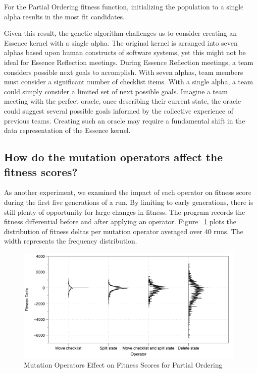 \documentclass[3p,times,procedia]{elsarticle}
\begin{document}
For the Partial Ordering fitness function, initializing the population to a single alpha results in the most fit candidates. 

Given this result, the genetic algorithm challenges us to consider creating an Essence kernel with a single alpha. The original kernel is arranged into seven alphas based upon human constructs of software systems, yet this might not be ideal for Essence Reflection meetings. During Essence Reflection meetings, a team considers possible next goals to accomplish. With seven alphas, team members must consider a significant number of checklist items. With a single alpha, a team could simply consider a limited set of next possible goals. Imagine a team meeting with the perfect oracle, once describing their current state, the oracle could suggest several possible goals informed by the collective experience of previous teams. Creating such an oracle may require a fundamental shift in the data representation of the Essence kernel.

\subsection{How do the mutation operators affect the fitness scores?}
As another experiment, we examined the impact of each operator on fitness score during the first five generations of a run. By limiting to early generations, there is still plenty of opportunity for large changes in fitness. The program records the fitness differential before and after applying an operator. Figure ~\ref{OperatorsPartialOrdering} plots the distribution of fitness deltas per mutation operator averaged over 40 runs. The width represents the frequency distribution.

\begin{figure}[ht]\vspace*{4pt}
\centerline{\includegraphics[width=6.25in]{images/operator_analysis_partial_order_first_5_gens}}
\caption{Mutation Operators Effect on Fitness Scores for Partial Ordering}\vspace*{-6pt}
\label{OperatorsPartialOrdering}
\end{figure}
\end{document}
